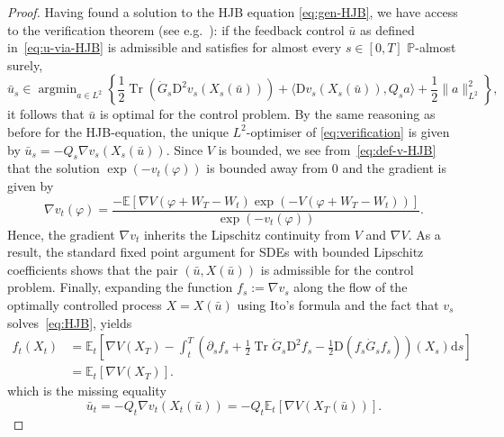 \documentclass[11pt, a4paper]{scrartcl}
\numberwithin{equation}{section}
\theoremstyle{plain}
\theoremstyle{remark}
\newcommand{\assign}{:=}
\newcommand{\mathD}{\mathrm{D}}
\newcommand{\mathd}{\mathrm{d}}
\newcommand{\tmop}[1]{\ensuremath{\operatorname{#1}}}
\begin{document}
\begin{proof}
	Having found a solution to the HJB equation \eqref{eq:gen-HJB}, we have
	access to the verification theorem (see
	e.g.~{\cite[Theorem~2.36]{fabbriStochasticOptimalControl2017}}): if the
	feedback control $\bar{u}$ as defined in~\eqref{eq:u-via-HJB} is admissible
	and satisfies for almost every $s \in [0, T]$ $\mathbb{P}$-almost surely,
	\begin{equation}
		\bar{u}_s \in \tmop{argmin}_{a \in L^2} \left\{ \frac{1}{2} \tmop{Tr}
		(\dot{G}_s \mathD^2 v_s (X_s (\bar{u}))) + \langle \mathD v_s (X_s
		(\bar{u})), Q_s a \rangle + \frac{1}{2} \| a \|^2_{L^2} \right\}, \label{eq:verification}
	\end{equation}
	it follows that $\bar{u}$ is optimal for the control problem. By the same
	reasoning as before for the HJB-equation, the unique $L^2$-optimiser of
	\eqref{eq:verification} is given by $\bar{u}_s = - Q_s \nabla v_s (X_s
		(\bar{u}))$. Since $V$ is bounded, we see from~\eqref{eq:def-v-HJB} that the
	solution $\exp (- v_t (\varphi))$ is bounded away from $0$ and the gradient
	is given by
	\begin{equation}
		\nabla v_t (\varphi) = \frac{-\mathbb{E} [\nabla V (\varphi + W_T - W_t)
				\exp (- V (\varphi + W_T - W_t))]}{\exp (- v_t (\varphi))} .
		\label{eq:gradv-HJB}
	\end{equation}
	Hence, the gradient $\nabla v_t$ inherits the Lipschitz continuity from $V$
	and $\nabla V$. As a result, the standard fixed point argument for SDEs with
	bounded Lipschitz coefficients shows that the pair $(\bar{u}, X (\bar{u}))$
	is admissible for the control problem. Finally, expanding the function $f_s
		\assign \nabla v_s$ along the flow of the optimally controlled process $X =
		X (\bar{u})$ using Ito's formula and the fact that $v_s$
	solves~\eqref{eq:HJB}, yields
	\begin{equation}
		\begin{aligned}
			f_t (X_t)
			 & =\mathbb{E}_t \left[ \nabla V (X_T) - \int_t^T \left( \partial_s
				f_s + \frac{1}{2} \tmop{Tr} \dot{G}_s \mathD^2 f_s - \frac{1}{2} \mathD
			(f_s  \dot{G}_s f_s) \right) (X_s) \mathd s \right]                 \\
			 & =\mathbb{E}_t [\nabla
			V (X_T)] .
		\end{aligned} \label{eq:flow-exact-sol}
	\end{equation}
	which is the missing equality
	\begin{equation}
		\bar{u}_t = - Q_t \nabla v_t (X_t (\bar{u})) = - Q_t \mathbb{E}_t [\nabla
		V (X_T (\bar{u}))] . \label{eq:v-V}
	\end{equation}
\end{proof}
\end{document}
